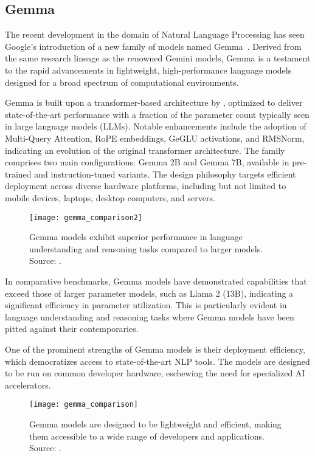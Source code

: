 \subsection{Gemma}
\label{subsec:gemma}

The recent development in the domain of Natural Language Processing has seen Google's introduction of a new family of models named Gemma~\cite{gemma_google_ai, gemmateam2024gemma}.
Derived from the same research lineage as the renowned Gemini models, Gemma is a testament to the rapid advancements in lightweight, high-performance language models designed for a broad spectrum of computational environments.

Gemma is built upon a transformer-based architecture by \textcite{vaswani2023attention}, optimized to deliver state-of-the-art performance with a fraction of the parameter count typically seen in large language models (LLMs).
Notable enhancements include the adoption of Multi-Query Attention, RoPE embeddings, GeGLU activations, and RMSNorm, indicating an evolution of the original transformer architecture.
The family comprises two main configurations: Gemma 2B and Gemma 7B, available in pre-trained and instruction-tuned variants.
The design philosophy targets efficient deployment across diverse hardware platforms, including but not limited to mobile devices, laptops, desktop computers, and servers.

\begin{figure}[ht!]
	\centering
	\texttt{[image: gemma\_comparison2]}
	\caption{Gemma models exhibit superior performance in language understanding and reasoning tasks compared to larger models. Source: \protect\textcite{gemmateam2024gemma}.}
	\label{fig:gemma-comparison2}
\end{figure}

In comparative benchmarks, Gemma models have demonstrated capabilities that exceed those of larger parameter models, such as Llama 2 (13B), indicating a significant efficiency in parameter utilization.
This is particularly evident in language understanding and reasoning tasks where Gemma models have been pitted against their contemporaries.

One of the prominent strengths of Gemma models is their deployment efficiency, which democratizes access to state-of-the-art NLP tools.
The models are designed to be run on common developer hardware, eschewing the need for specialized AI accelerators.

\begin{figure}[ht!]
	\centering
	\texttt{[image: gemma\_comparison]}
	\caption{Gemma models are designed to be lightweight and efficient, making them accessible to a wide range of developers and applications. Source: \protect\textcite{gemma_google_ai}.}
	\label{fig:gemma-comparison}
\end{figure}

